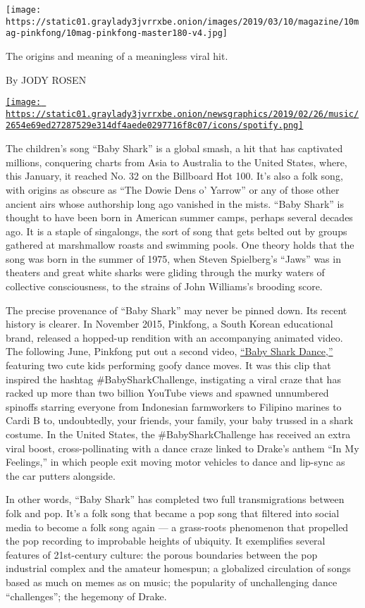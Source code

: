 \texttt{[image: https://static01.graylady3jvrrxbe.onion/images/2019/03/10/magazine/10mag-pinkfong/10mag-pinkfong-master180-v4.jpg]}

The origins and meaning of a meaningless viral hit.

By JODY ROSEN

\href{https://open.spotify.com/track/5ygDXis42ncn6kYG14lEVG}{\texttt{[image: https://static01.graylady3jvrrxbe.onion/newsgraphics/2019/02/26/music/2654e69ed27287529e314df4aede0297716f8c07/icons/spotify.png]}}

The children's song ``Baby Shark'' is a global smash, a hit that has
captivated millions, conquering charts from Asia to Australia to the
United States, where, this January, it reached No. 32 on the Billboard
Hot 100. It's also a folk song, with origins as obscure as ``The Dowie
Dens o' Yarrow'' or any of those other ancient airs whose authorship
long ago vanished in the mists. ``Baby Shark'' is thought to have been
born in American summer camps, perhaps several decades ago. It is a
staple of singalongs, the sort of song that gets belted out by groups
gathered at marshmallow roasts and swimming pools. One theory holds that
the song was born in the summer of 1975, when Steven Spielberg's
``Jaws'' was in theaters and great white sharks were gliding through the
murky waters of collective consciousness, to the strains of John
Williams's brooding score.

The precise provenance of ``Baby Shark'' may never be pinned down. Its
recent history is clearer. In November 2015, Pinkfong, a South Korean
educational brand, released a hopped-up rendition with an accompanying
animated video. The following June, Pinkfong put out a second video,
\href{https://www.youtube.com/watch?v=XqZsoesa55w}{``Baby Shark
Dance,''} featuring two cute kids performing goofy dance moves. It was
this clip that inspired the hashtag \#BabySharkChallenge, instigating a
viral craze that has racked up more than two billion YouTube views and
spawned unnumbered spinoffs starring everyone from Indonesian
farmworkers to Filipino marines to Cardi B to, undoubtedly, your
friends, your family, your baby trussed in a shark costume. In the
United States, the \#BabySharkChallenge has received an extra viral
boost, cross-pollinating with a dance craze linked to Drake's anthem
``In My Feelings,'' in which people exit moving motor vehicles to dance
and lip-sync as the car putters alongside.

In other words, ``Baby Shark'' has completed two full transmigrations
between folk and pop. It's a folk song that became a pop song that
filtered into social media to become a folk song again --- a grass-roots
phenomenon that propelled the pop recording to improbable heights of
ubiquity. It exemplifies several features of 21st-century culture: the
porous boundaries between the pop industrial complex and the amateur
homespun; a globalized circulation of songs based as much on memes as on
music; the popularity of unchallenging dance ``challenges''; the
hegemony of Drake.

